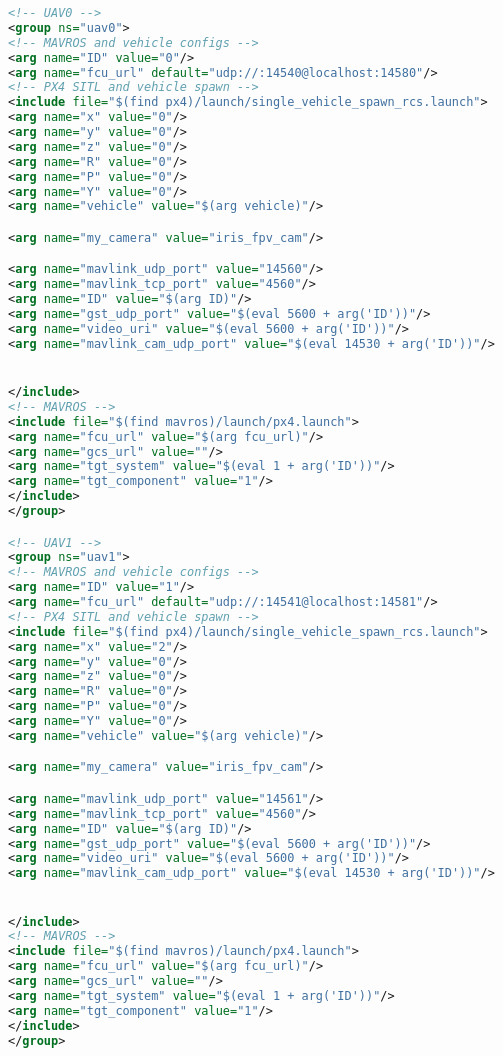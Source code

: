 \begin{lstlisting}[language={XML}]
<!-- UAV0 -->
<group ns="uav0">
<!-- MAVROS and vehicle configs -->
<arg name="ID" value="0"/>
<arg name="fcu_url" default="udp://:14540@localhost:14580"/>
<!-- PX4 SITL and vehicle spawn -->
<include file="$(find px4)/launch/single_vehicle_spawn_rcs.launch">
<arg name="x" value="0"/>
<arg name="y" value="0"/>
<arg name="z" value="0"/>
<arg name="R" value="0"/>
<arg name="P" value="0"/>
<arg name="Y" value="0"/>
<arg name="vehicle" value="$(arg vehicle)"/>

<arg name="my_camera" value="iris_fpv_cam"/>

<arg name="mavlink_udp_port" value="14560"/>
<arg name="mavlink_tcp_port" value="4560"/>
<arg name="ID" value="$(arg ID)"/>
<arg name="gst_udp_port" value="$(eval 5600 + arg('ID'))"/>
<arg name="video_uri" value="$(eval 5600 + arg('ID'))"/>
<arg name="mavlink_cam_udp_port" value="$(eval 14530 + arg('ID'))"/>


</include>
<!-- MAVROS -->
<include file="$(find mavros)/launch/px4.launch">
<arg name="fcu_url" value="$(arg fcu_url)"/>
<arg name="gcs_url" value=""/>
<arg name="tgt_system" value="$(eval 1 + arg('ID'))"/>
<arg name="tgt_component" value="1"/>
</include>
</group>

<!-- UAV1 -->
<group ns="uav1">                              
<!-- MAVROS and vehicle configs -->
<arg name="ID" value="1"/>
<arg name="fcu_url" default="udp://:14541@localhost:14581"/>
<!-- PX4 SITL and vehicle spawn -->
<include file="$(find px4)/launch/single_vehicle_spawn_rcs.launch">
<arg name="x" value="2"/>
<arg name="y" value="0"/>
<arg name="z" value="0"/>
<arg name="R" value="0"/>
<arg name="P" value="0"/>
<arg name="Y" value="0"/>
<arg name="vehicle" value="$(arg vehicle)"/>

<arg name="my_camera" value="iris_fpv_cam"/>

<arg name="mavlink_udp_port" value="14561"/>
<arg name="mavlink_tcp_port" value="4560"/>
<arg name="ID" value="$(arg ID)"/>
<arg name="gst_udp_port" value="$(eval 5600 + arg('ID'))"/>
<arg name="video_uri" value="$(eval 5600 + arg('ID'))"/>
<arg name="mavlink_cam_udp_port" value="$(eval 14530 + arg('ID'))"/>


</include>
<!-- MAVROS -->
<include file="$(find mavros)/launch/px4.launch">
<arg name="fcu_url" value="$(arg fcu_url)"/>
<arg name="gcs_url" value=""/>
<arg name="tgt_system" value="$(eval 1 + arg('ID'))"/>
<arg name="tgt_component" value="1"/>
</include>
</group>
\end{lstlisting}


